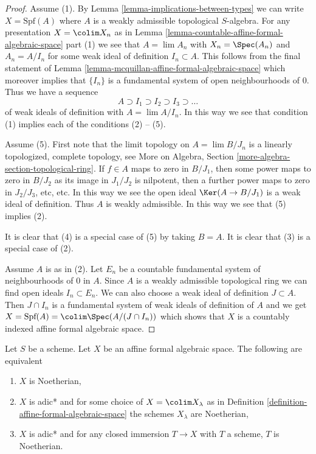 \begin{proof}
Assume (1). By Lemma \ref{lemma-implications-between-types}
we can write $X = \text{Spf}(A)$ where $A$ is a weakly admissible
topological $S$-algebra. For any presentation $X = \colim X_n$ as in
Lemma \ref{lemma-countable-affine-formal-algebraic-space} part (1)
we see that $A = \lim A_n$ with $X_n = \Spec(A_n)$ and
$A_n = A/I_n$ for some weak ideal of definition $I_n \subset A$.
This follows from the final statement of
Lemma \ref{lemma-mcquillan-affine-formal-algebraic-space}
which moreover implies that $\{I_n\}$ is a fundamental system
of open neighbourhoods of $0$. Thus we have a sequence
$$
A \supset I_1 \supset I_2 \supset I_3 \supset \ldots
$$
of weak ideals of definition with $A = \lim A/I_n$. In this way
we see that condition (1) implies each of the conditions (2) -- (5).

\medskip\noindent
Assume (5). First note that the limit topology on
$A = \lim B/J_n$ is a linearly topologized, complete topology, see
More on Algebra, Section \ref{more-algebra-section-topological-ring}.
If $f \in A$ maps to zero in $B/J_1$, then some power maps to zero
in $B/J_2$ as its image in $J_1/J_2$ is nilpotent, then a further
power maps to zero in $J_2/J_3$, etc, etc. In this way we see
the open ideal $\Ker(A \to B/J_1)$ is a weak ideal of definition.
Thus $A$ is weakly admissible. In this way we see that (5) implies (2).

\medskip\noindent
It is clear that (4) is a special case of (5) by taking $B = A$.
It is clear that (3) is a special case of (2).

\medskip\noindent
Assume $A$ is as in (2). Let $E_n$ be a countable fundamental
system of neighbourhoods of $0$ in $A$. Since $A$ is a weakly
admissible topological ring we can find open ideals $I_n \subset E_n$.
We can also choose a weak ideal of definition $J \subset A$.
Then $J \cap I_n$ is a fundamental system of weak ideals of definition
of $A$ and we get
$X = \text{Spf}(A) = \colim \Spec(A/(J \cap I_n))$
which shows that $X$ is a countably indexed affine formal algebraic space.
\end{proof}

\begin{lemma}
\label{lemma-characterize-noetherian-affine}
Let $S$ be a scheme. Let $X$ be an affine formal algebraic space.
The following are equivalent
\begin{enumerate}
\item $X$ is Noetherian,
\item $X$ is adic* and for some choice of $X = \colim X_\lambda$ as in
Definition \ref{definition-affine-formal-algebraic-space}
the schemes $X_\lambda$ are Noetherian,
\item $X$ is adic* and for any closed immersion $T \to X$ with $T$
a scheme, $T$ is Noetherian.
\end{enumerate}
\end{lemma}

